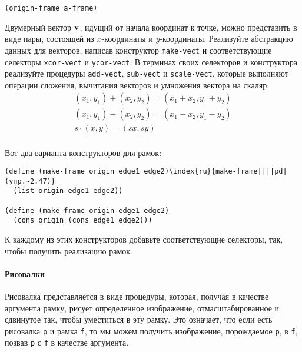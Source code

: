 \begin{Verbatim}[fontsize=\small]
(origin-frame a-frame)
\end{Verbatim}
\begin{exercise}{2.46}\label{EX2.46}%
Двумерный    вектор ${\bf v}$, идущий от начала 
координат к точке, можно представить в виде пары, состоящей из
$x$-координаты и $y$-координаты.  Реализуйте
абстракцию данных для векторов, написав конструктор
{\tt make-vect}
и соответствующие селекторы
{\tt xcor-vect} 
и {\tt ycor-vect}. 
В терминах своих
селекторов и конструктора реализуйте процедуры {\tt add-vect},
{\tt sub-vect} и {\tt scale-vect}, которые выполняют
операции сложения, вычитания векторов и умножения вектора на скаляр:
$$
  \begin{array}{c}
    (x_1, y_1) + (x_2, y_2) = (x_1 + x_2, y_1 + y_2) \\
    (x_1, y_1) - (x_2, y_2) = (x_1 - x_2, y_1 - y_2) \\
    s \cdot (x, y) = (sx, sy) \\
  \end{array}
$$
\end{exercise}
\begin{exercise}{2.47}\label{EX2.47}%
Вот два варианта конструкторов для рамок:

\begin{Verbatim}[fontsize=\small]
(define (make-frame origin edge1 edge2)\index{ru}{make-frame||||pd|(упр.~2.47)}
  (list origin edge1 edge2))

(define (make-frame origin edge1 edge2)
  (cons origin (cons edge1 edge2)))
\end{Verbatim}
К каждому из этих конструкторов  добавьте соответствующие селекторы,
так, чтобы получить реализацию рамок.
\end{exercise}

\paragraph{Рисовалки}


 Рисовалка представляется в виде процедуры, которая,
получая в качестве аргумента рамку, рисует определенное изображение,
отмасштабированное и сдвинутое так, чтобы уместиться в эту рамку.  Это 
означает, что если есть рисовалка {\tt p} и рамка
{\tt f}, то мы можем получить изображение, порождаемое
{\tt p}, в {\tt f}, позвав {\tt p} с
{\tt f} в качестве аргумента.

